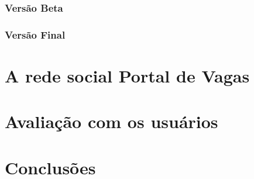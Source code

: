 \documentclass[cic,tc]{iiufrgs}
\begin{document}
\subsection{Versão Beta}
\label{implementacaoBR}

\subsection{Versão Final}
\label{implementacaoFR}

\chapter{A rede social Portal de Vagas}
\label{redeSocialPortal}

\chapter{Avaliação com os usuários}
\label{Avaliação}

\chapter{Conclusões}
\label{conclusao}






\end{document}
